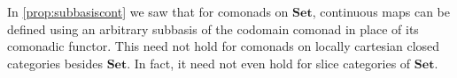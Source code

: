 \documentclass[11pt, oneside, article]{memoir}
\theoremstyle{plain}
\theoremstyle{definition}
\theoremstyle{remark}
\newenvironment{counterexample}
{\renewcommand\qedsymbol{$\lrcorner$}%
  \pushQED{\qed}\mycounterexample}
{\popQED\endmycounterexample}
\newcommand{\ot}{\leftarrow}
\newcommand{\namedcat}[1]{\mathbf{#1}}
\newcommand{\Set}{\namedcat{Set}}
\begin{document}

In \cref{prop:subbasiscont} we saw that for comonads on $\Set$,
continuous maps can be defined using an arbitrary subbasis of the
codomain comonad in place of its comonadic functor. This need not hold
for comonads on locally cartesian closed categories besides $\Set$. In
fact, it need not even hold for slice categories of $\Set$.
\end{document}
